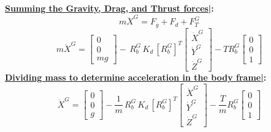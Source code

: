 \documentclass[conf]{new-aiaa}
\begin{document}
\noindent\textbf{\ul{Summing the Gravity, Drag, and Thrust forces|}:}
$$m\ddot{X}^G = F_g+F_d+F_T^G $$
$$m\ddot{X}^G = \begin{bmatrix}
0\\0\\mg
\end{bmatrix}-\,R_b^G\, K_d\,[R_b^G]^T \begin{bmatrix}\dot{X}^G\\\dot{Y}^G\\\dot{Z}^G \end{bmatrix}-TR_b^G\begin{bmatrix}
    0\\0\\1
\end{bmatrix} $$
\textbf{\ul{Dividing mass to determine acceleration in the body frame|}:}
\begin{equation}\boxed{\ddot{X}^G = \begin{bmatrix}
0\\0\\g
\end{bmatrix}-\frac{1}{m}\,R_b^G\, K_d\,[R_b^G]^T \begin{bmatrix}\dot{X}^G\\\dot{Y}^G\\\dot{Z}^G \end{bmatrix}-\frac{T}{m}R_b^G\begin{bmatrix}
    0\\0\\1
\end{bmatrix}}\label{eq:ddotX^G}\end{equation}
\end{document}
